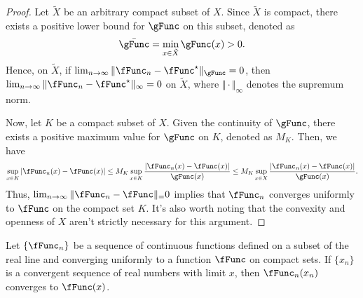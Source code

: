 \documentclass[\econtexRoot/BufferStockTheory]{subfiles}
\begin{document}
\begin{proof}
Let $\tilde{X}$ be an arbitrary compact subset of $X$.
Since $\tilde{X}$ is compact, there exists a positive lower bound for $\gFunc$ on this subset, denoted as 
\begin{equation}
\bar{\gFunc} = \min_{x \in \tilde{X}} \gFunc(x) > 0.
\end{equation}
Hence, on $\tilde{X}$, if $\lim_{n \to \infty} \Vert \fFunc_n - \fFunc^{\star} \Vert_\gFunc = 0$, then $\lim_{n \to \infty} \Vert \fFunc_n - \fFunc^{\star} \Vert_\infty = 0$ on $\tilde{X}$, where $\Vert \cdot \Vert_\infty$ denotes the supremum norm.


Now, let $K$ be a compact subset of $X$.
Given the continuity of $\gFunc$, there exists a positive maximum value for $\gFunc$ on $K$, denoted as $M_K$.
Then, we have
\begin{equation}
\sup_{x \in K} \vert \fFunc_n(x) - \fFunc(x)\vert  \leq M_K \sup_{x \in K} \frac{\vert \fFunc_n(x) - \fFunc(x)\vert }{\gFunc(x)} \leq M_K \sup_{x \in X} \frac{\vert \fFunc_n(x) - \fFunc(x)\vert }{\gFunc(x)}.
\end{equation}
Thus, $\lim_{n \to \infty} \Vert \fFunc_n - \fFunc \Vert_  = 0$ implies that $\fFunc_n$ converges uniformly to $\fFunc$ on the compact set $K$.
It's also worth noting that the convexity and openness of $X$ aren't strictly necessary for this argument.
\end{proof}

\begin{fact}\label{fact:compactnt}
Let $\{\fFunc_n\}$ be a sequence of continuous functions defined on a subset of the real line and converging uniformly to a function $\fFunc$ on compact sets. If $\{x_n\}$ is a convergent sequence of real numbers with limit $x$, then $\fFunc_n(x_n)$ converges to $\fFunc(x)$.
\end{fact}
\end{document}
